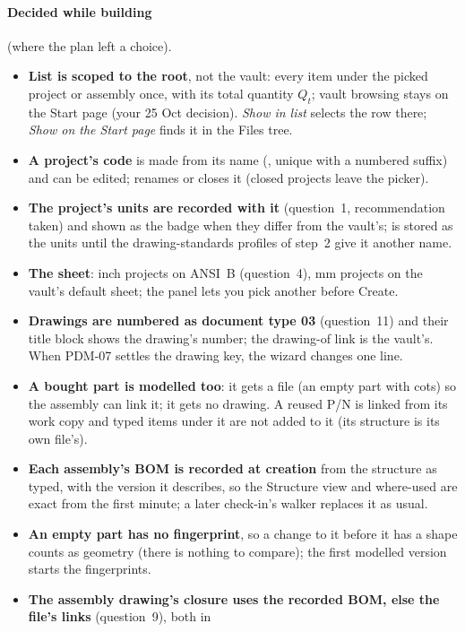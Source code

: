 \paragraph{Decided while building} (where the plan left a choice).
\begin{itemize}[nosep]
  \item \textbf{List is scoped to the root}, not the vault: every item under the picked project or assembly once,
        with its total quantity $Q_t$; vault browsing stays on the Start page (your 25 Oct decision). \emph{Show in
        list} selects the row there; \emph{Show on the Start page} finds it in the Files tree.
  \item \textbf{A project's code} is made from its name (, unique with a numbered suffix) and can
        be edited;  renames or closes it (closed projects leave the picker).
  \item \textbf{The project's units are recorded with it} (question~1, recommendation taken) and shown as the
        badge when they differ from the vault's;  is stored as the units until the
        drawing-standards profiles of step~2 give it another name.
  \item \textbf{The sheet}: inch projects on ANSI~B (question~4), mm projects on the vault's default sheet; the
        panel lets you pick another before Create.
  \item \textbf{Drawings are numbered as document type 03} (question~11) and their title block shows the
        drawing's number; the drawing-of link is the vault's. When PDM-07 settles the drawing key, the wizard
        changes one line.
  \item \textbf{A bought part is modelled too}: it gets a file (an empty part with  cots) so the
        assembly can link it; it gets no drawing. A reused P/N is linked from its work copy and typed items under it
        are not added to it (its structure is its own file's).
  \item \textbf{Each assembly's BOM is recorded at creation} from the structure as typed, with the version it
        describes, so the Structure view and where-used are exact from the first minute; a later check-in's walker
        replaces it as usual.
  \item \textbf{An empty part has no fingerprint}, so a change to it before it has a shape counts as geometry
        (there is nothing to compare); the first modelled version starts the fingerprints.
  \item \textbf{The assembly drawing's closure uses the recorded BOM, else the file's links} (question~9), both in

\end{itemize}
